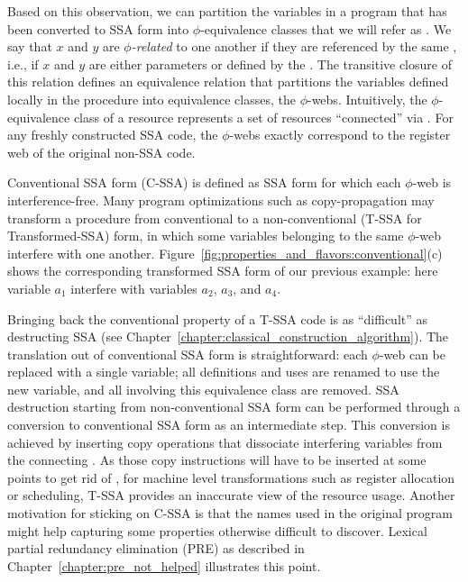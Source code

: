 Based on this observation, we can partition the variables in a 
program that has been converted to SSA form into $\phi$-equivalence classes that we will refer as \phiwebs\index{\phiweb}. 
We say that $x$ and $y$ are \emph{$\phi$-related} to one another
if they are referenced by the same \phifun, i.e., 
if $x$ and $y$ are either parameters or defined by the \phifun. The transitive closure of this relation defines an equivalence relation that 
partitions the variables defined locally in the procedure into equivalence classes, the $\phi$-webs.
Intuitively, the $\phi$-equivalence class of a resource represents a set of resources ``connected'' via \phifuns.
For any freshly constructed SSA code, the $\phi$-webs exactly correspond to the register web of the original non-SSA code.

Conventional SSA form (C-SSA) is defined as SSA form for which each $\phi$-web
is interference-free. Many program optimizations such as copy-propagation may transform a procedure from conventional
to a non-conventional (T-SSA for Transformed-SSA) form, in which some variables belonging to
the same $\phi$-web interfere with one another. Figure~\ref{fig:properties_and_flavors:conventional}(c)
shows the corresponding transformed SSA form of our previous example: here variable $a_1$ interfere with variables $a_2$, $a_3$, and $a_4$.

Bringing back the conventional property of a T-SSA code is as ``difficult'' as destructing SSA (see Chapter~\ref{chapter:classical_construction_algorithm}). 
The translation out of conventional SSA form
is straightforward: each $\phi$-web can be replaced with a single
variable; all definitions and uses are renamed to use the new variable,
and all \phifuns involving this equivalence class are removed. 
SSA destruction
starting from non-conventional SSA form can be performed through a conversion to 
conventional SSA form as an intermediate step. This conversion is
achieved by inserting copy operations that dissociate interfering variables from the connecting \phifuns. 
As those copy instructions will have to be inserted at some points to get rid of \phifuns, for machine level transformations such as register allocation or scheduling, T-SSA provides an inaccurate view of the resource usage. Another motivation for sticking on C-SSA is that the names used in the original program might help capturing some properties otherwise difficult to discover. Lexical partial redundancy elimination (PRE) as described in Chapter~\ref{chapter:pre_not_helped} illustrates this point.

